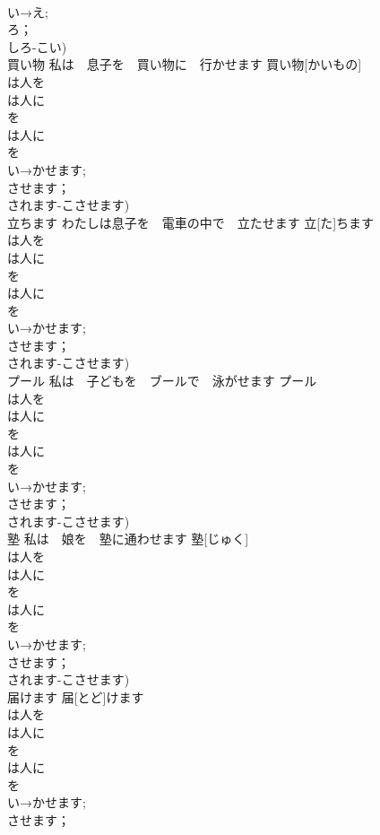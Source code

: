 \documentclass[8pt]{extreport}
\begin{document}
\begin{CJK}{UTF8}{min}
\\	い→え;
\\	ろ；
\\	しろ-こい)
\\	買い物	私は　息子を　買い物に　行かせます	買い物[かいもの]				
\\	は人を
\\	は人に
\\	を
\\	は人に
\\	を
\\	い→かせます;
\\	させます；
\\	されます-こさせます)
\\	立ちます	わたしは息子を　電車の中で　立たせます	立[た]ちます				
\\	は人を
\\	は人に
\\	を
\\	は人に
\\	を
\\	い→かせます;
\\	させます；
\\	されます-こさせます)
\\	プール	私は　子どもを　ブールで　泳がせます	プール			
\\	は人を
\\	は人に
\\	を
\\	は人に
\\	を
\\	い→かせます;
\\	させます；
\\	されます-こさせます)
\\	塾	私は　娘を　塾に通わせます	塾[じゅく]			
\\	は人を
\\	は人に
\\	を
\\	は人に
\\	を
\\	い→かせます;
\\	させます；
\\	されます-こさせます)
\\	届けます		届[とど]けます			
\\	は人を
\\	は人に
\\	を
\\	は人に
\\	を
\\	い→かせます;
\\	させます；

\end{CJK}
\end{document}
